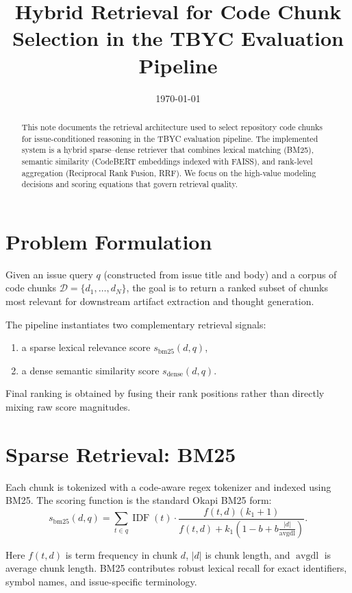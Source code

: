 \documentclass[11pt]{article}
\title{Hybrid Retrieval for Code Chunk Selection in the TBYC Evaluation Pipeline}
\author{}
\date{\today}
\begin{document}
\maketitle

\begin{abstract}
This note documents the retrieval architecture used to select repository code chunks for issue-conditioned reasoning in the TBYC evaluation pipeline. The implemented system is a hybrid sparse--dense retriever that combines lexical matching (BM25), semantic similarity (CodeBERT embeddings indexed with FAISS), and rank-level aggregation (Reciprocal Rank Fusion, RRF). We focus on the high-value modeling decisions and scoring equations that govern retrieval quality.
\end{abstract}

\section{Problem Formulation}
Given an issue query $q$ (constructed from issue title and body) and a corpus of code chunks $\mathcal{D}=\{d_1,\dots,d_N\}$, the goal is to return a ranked subset of chunks most relevant for downstream artifact extraction and thought generation.

The pipeline instantiates two complementary retrieval signals:
\begin{enumerate}
  \item a sparse lexical relevance score $s_{\text{bm25}}(d,q)$,
  \item a dense semantic similarity score $s_{\text{dense}}(d,q)$.
\end{enumerate}
Final ranking is obtained by fusing their rank positions rather than directly mixing raw score magnitudes.

\section{Sparse Retrieval: BM25}
Each chunk is tokenized with a code-aware regex tokenizer and indexed using BM25. The scoring function is the standard Okapi BM25 form:
\begin{equation}
\label{eq:bm25}
s_{\text{bm25}}(d,q)
= \sum_{t \in q}
\operatorname{IDF}(t)
\cdot
\frac{f(t,d)(k_1+1)}{f(t,d)+k_1\left(1-b+b\frac{|d|}{\operatorname{avgdl}}\right)}.
\end{equation}

Here $f(t,d)$ is term frequency in chunk $d$, $|d|$ is chunk length, and $\operatorname{avgdl}$ is average chunk length. BM25 contributes robust lexical recall for exact identifiers, symbol names, and issue-specific terminology.
\end{document}
